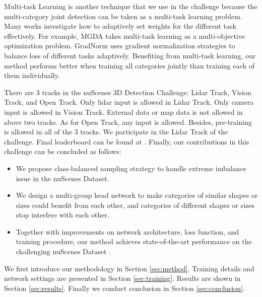 \documentclass[10pt,twocolumn,letterpaper]{article}
\begin{document}
 Multi-task Learning is another technique that we use in the challenge because the multi-category joint detection can be taken as a multi-task learning problem. Many works investigate how to adaptively set weights for the different task effectively. For example, MGDA \cite{DBLP:journals/corr/abs-1810-04650} takes multi-task learning as a multi-objective optimization problem. GradNorm \cite{DBLP:journals/corr/abs-1711-02257} uses gradient normalization strategies to balance loss of different tasks adaptively. Benefiting from multi-task learning, our method performs better when training all categories jointly than training each of them individually.

There are 3 tracks in the nuScenes 3D Detection Challenge: Lidar Track, Vision Track, and Open Track. Only lidar input is allowed in Lidar Track. Only camera input is allowed in Vision Track. External data or map data is not allowed in above two tracks. As for Open Track, any input is allowed. Besides, pre-training is allowed in all of the 3 tracks. We participate in the Lidar Track of the challenge. Final leaderboard can be found at \cite{nusc3ddet}. Finally, our contributions in this challenge can be concluded as follows:
\begin{itemize}
    \item We propose class-balanced sampling strategy to handle extreme imbalance issue in the nuScenes Dataset.
    \item We design a multi-group head network to make categories of similar shapes or sizes could benefit from each other, and categories of different shapes or sizes stop interfere with each other. 
    \item  Together with improvements on network architecture, loss function, and training procedure, our method achieves state-of-the-art performance on the challenging nuScenes Dataset \cite{nuscenes}.
\end{itemize}

We first introduce our methodology in Section \ref{sec:method}. Training details and network settings are presented in Section \ref{sec:training}. Results are shown in Section \ref{sec:results}. Finally we conduct conclusion in Section \ref{sec:conclusion}.
\end{document}
